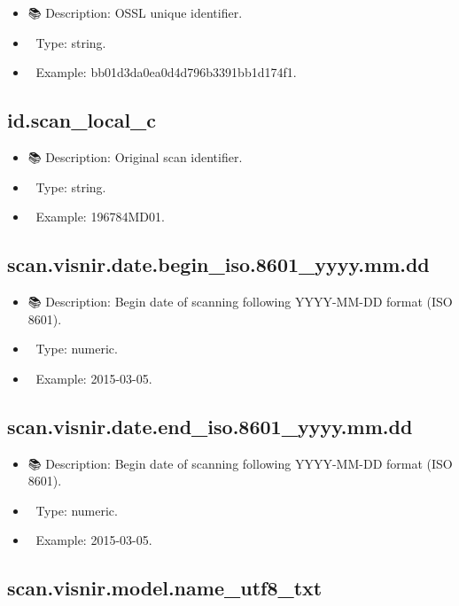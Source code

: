 \documentclass[
  letterpaper,
  DIV=11,
  numbers=noendperiod]{scrreprt}
\providecommand{\tightlist}{%
  \setlength{\itemsep}{0pt}\setlength{\parskip}{0pt}}\usepackage{longtable,booktabs,array}
\begin{document}
\begin{itemize}
\tightlist
\item
  📚 Description: OSSL unique identifier.
\item
  🔢 Type: string.
\item
  📖 Example: bb01d3da0ea0d4d796b3391bb1d174f1.
\end{itemize}

\subsection{id.scan\_local\_c}\label{id.scan_local_c-1}

\begin{itemize}
\tightlist
\item
  📚 Description: Original scan identifier.
\item
  🔢 Type: string.
\item
  📖 Example: 196784MD01.
\end{itemize}

\subsection{scan.visnir.date.begin\_iso.8601\_yyyy.mm.dd}\label{scan.visnir.date.begin_iso.8601_yyyy.mm.dd}

\begin{itemize}
\tightlist
\item
  📚 Description: Begin date of scanning following YYYY-MM-DD format
  (ISO 8601).
\item
  🔢 Type: numeric.
\item
  📖 Example: 2015-03-05.
\end{itemize}

\subsection{scan.visnir.date.end\_iso.8601\_yyyy.mm.dd}\label{scan.visnir.date.end_iso.8601_yyyy.mm.dd}

\begin{itemize}
\tightlist
\item
  📚 Description: Begin date of scanning following YYYY-MM-DD format
  (ISO 8601).
\item
  🔢 Type: numeric.
\item
  📖 Example: 2015-03-05.
\end{itemize}

\subsection{scan.visnir.model.name\_utf8\_txt}\label{scan.visnir.model.name_utf8_txt}
\end{document}
